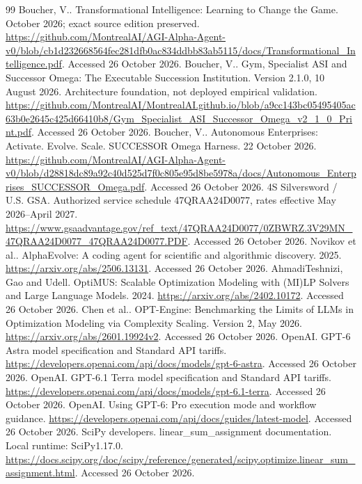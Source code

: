 \begin{thebibliography}{99}
 Boucher, V.. Transformational Intelligence: Learning to Change the Game. October 2026; exact source edition preserved. \url{https://github.com/MontrealAI/AGI-Alpha-Agent-v0/blob/cb1d232668564fec281dfb0ac834ddbb83ab5115/docs/Transformational_Intelligence.pdf}. Accessed 26 October 2026.
 Boucher, V.. Gym, Specialist ASI and Successor Omega: The Executable Succession Institution. Version 2.1.0, 10 August 2026. Architecture foundation, not deployed empirical validation. \url{https://github.com/MontrealAI/MontrealAI.github.io/blob/a9cc143bc05495405ac63b0e2645c425d66410b8/Gym_Specialist_ASI_Successor_Omega_v2_1_0_Print.pdf}. Accessed 26 October 2026.
 Boucher, V.. Autonomous Enterprises: Activate. Evolve. Scale. SUCCESSOR Omega Harness. 22 October 2026. \url{https://github.com/MontrealAI/AGI-Alpha-Agent-v0/blob/d28818dc89a92c40d525d7f0c805e95d8be5978a/docs/Autonomous_Enterprises_SUCCESSOR_Omega.pdf}. Accessed 26 October 2026.
 4S Silversword / U.S. GSA. Authorized service schedule 47QRAA24D0077, rates effective May 2026--April 2027. \url{https://www.gsaadvantage.gov/ref_text/47QRAA24D0077/0ZBWRZ.3V29MN_47QRAA24D0077_47QRAA24D0077.PDF}. Accessed 26 October 2026.
 Novikov et al.. AlphaEvolve: A coding agent for scientific and algorithmic discovery. 2025. \url{https://arxiv.org/abs/2506.13131}. Accessed 26 October 2026.
 AhmadiTeshnizi, Gao and Udell. OptiMUS: Scalable Optimization Modeling with (MI)LP Solvers and Large Language Models. 2024. \url{https://arxiv.org/abs/2402.10172}. Accessed 26 October 2026.
 Chen et al.. OPT-Engine: Benchmarking the Limits of LLMs in Optimization Modeling via Complexity Scaling. Version 2, May 2026. \url{https://arxiv.org/abs/2601.19924v2}. Accessed 26 October 2026.
 OpenAI. GPT-6 Astra model specification and Standard API tariffs. \url{https://developers.openai.com/api/docs/models/gpt-6-astra}. Accessed 26 October 2026.
 OpenAI. GPT-6.1 Terra model specification and Standard API tariffs. \url{https://developers.openai.com/api/docs/models/gpt-6.1-terra}. Accessed 26 October 2026.
 OpenAI. Using GPT-6: Pro execution mode and workflow guidance. \url{https://developers.openai.com/api/docs/guides/latest-model}. Accessed 26 October 2026.
 SciPy developers. linear\_\allowbreak{}sum\_\allowbreak{}assignment documentation. Local runtime: SciPy1.17.0. \url{https://docs.scipy.org/doc/scipy/reference/generated/scipy.optimize.linear_sum_assignment.html}. Accessed 26 October 2026.

\end{thebibliography}
